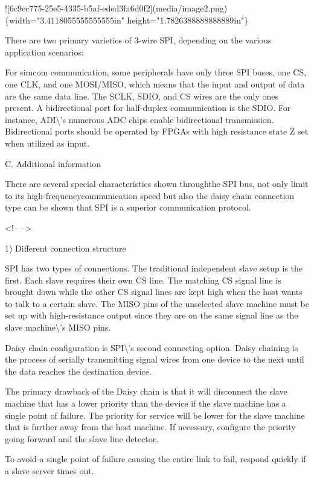 \documentclass[12pt,a4paper]{article}
\numberwithin{equation}{section}
\begin{document}
    ![6c9ec775-25e5-4335-b5af-eded3fa6d0f2](media/image2.png)\{width="3.4118055555555555in"
    height="1.7826388888888889in"\}

    There are two primary varieties of 3-wire SPI, depending on the
    various application scenarios:

    For simcom communication, some peripherals have only three SPI
    buses, one CS, one CLK, and one MOSI/MISO, which means that the
    input and output of data are the same data line. The SCLK, SDIO, and
    CS wires are the only ones present. A bidirectional port for
    half-duplex communication is the SDIO. For instance, ADI\textbackslash{}'s numerous
    ADC chips enable bidirectional transmission. Bidirectional ports
    should be operated by FPGAs with high resistance state Z set when
    utilized as input.

C.  Additional information

    There are several special characteristics shown throughthe SPI bus,
    not only limit to its high-frequencycommunication speed but also the
    daisy chain connection type can be shown that SPI is a superior
    communication protocol.

<!-- -->

1)  Different connection structure

    SPI has two types of connections. The traditional independent slave
    setup is the first. Each slave requires their own CS line. The
    matching CS signal line is brought down while the other CS signal
    lines are kept high when the host wants to talk to a certain slave.
    The MISO pins of the unselected slave machine must be set up with
    high-resistance output since they are on the same signal line as the
    slave machine\textbackslash{}'s MISO pins.

    Daisy chain configuration is SPI\textbackslash{}'s second connecting option. Daisy
    chaining is the process of serially transmitting signal wires from
    one device to the next until the data reaches the destination
    device.

    The primary drawback of the Daisy chain is that it will disconnect
    the slave machine that has a lower priority than the device if the
    slave machine has a single point of failure. The priority for
    service will be lower for the slave machine that is further away
    from the host machine. If necessary, configure the priority going
    forward and the slave line detector.

    To avoid a single point of failure causing the entire link to fail,
    respond quickly if a slave server times out.
\end{document}
